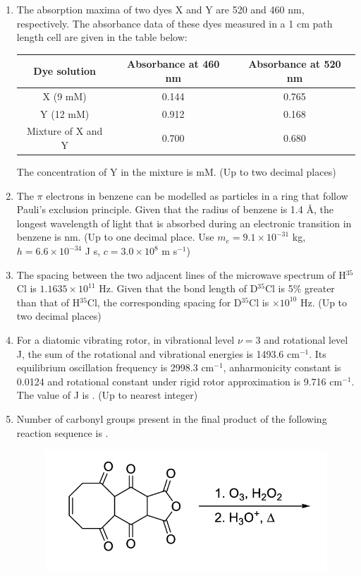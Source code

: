 \documentclass{article}
\begin{document}
\begin{enumerate}
\item The absorption maxima of two dyes X and Y are 520 and 460 nm, respectively. The absorbance data of these dyes measured in a 1 cm path length cell are given in the table below:

\begin{center}
\begin{tabular}{|c|c|c|}
\hline
Dye solution & Absorbance at 460 nm & Absorbance at 520 nm \\
\hline
 X (9 mM) & 0.144 & 0.765 \\
Y (12 mM) & 0.912 & 0.168 \\
Mixture of X and Y & 0.700 & 0.680 \\
\hline
\end{tabular}
\end{center}

The concentration of Y in the mixture is \underline{\hspace{2cm}} mM. (Up to two decimal places)

\item The $\pi$ electrons in benzene can be modelled as particles in a ring that follow Pauli’s 
exclusion principle. Given that the radius of benzene is 1.4 \AA, the longest wavelength of light 
that is absorbed during an electronic transition in benzene is \underline{\hspace{2cm}} nm.  
(Up to one decimal place. Use $m_e=9.1\times 10^{-31}$ kg, $h=6.6\times 10^{-34}$ J s, $c=3.0\times 10^8$ m s$^{-1}$)

\item The spacing between the two adjacent lines of the microwave spectrum of H$^{35}$Cl is 
$1.1635\times 10^{11}$ Hz. Given that the bond length of D$^{35}$Cl is 5\% greater than that of H$^{35}$Cl, 
the corresponding spacing for D$^{35}$Cl is \underline{\hspace{2cm}} $\times 10^{10}$ Hz. (Up to two decimal places)

\item For a diatomic vibrating rotor, in vibrational level $\nu=3$ and rotational level J, the sum of 
the rotational and vibrational energies is 1493.6 cm$^{-1}$. Its equilibrium oscillation frequency is 
2998.3 cm$^{-1}$, anharmonicity constant is 0.0124 and rotational constant under rigid rotor 
approximation is 9.716 cm$^{-1}$. The value of J is \underline{\hspace{2cm}}. (Up to nearest integer)

\item Number of carbonyl groups present in the final product of the following reaction sequence is \underline{\hspace{2cm}}.
\begin{figure}[H]
    \centering
    \includegraphics[width=0.5\columnwidth]{figures/cy_q53.png}
    \label{fig:placeholder}
\end{figure}


\end{enumerate}
\end{document}
